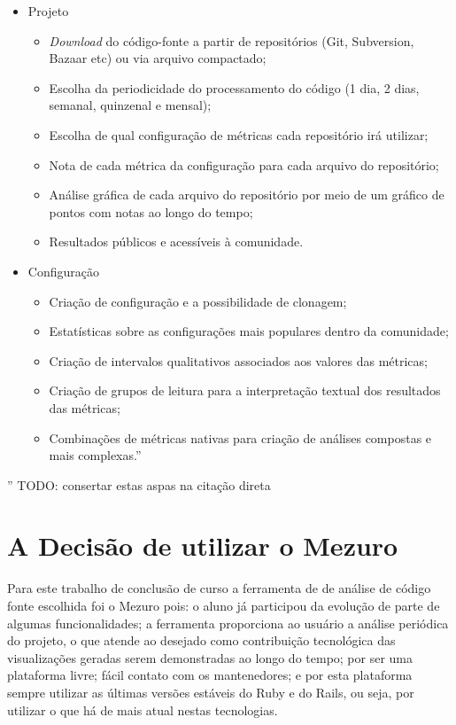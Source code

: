 \begin{itemize}
  \item Projeto
    \begin{itemize}
    \item \textit{Download} do código-fonte a partir de repositórios (Git,
    Subversion, Bazaar etc) ou via arquivo compactado;
        \item Escolha da periodicidade do processamento do código (1 dia, 2 dias,
        semanal, quinzenal e mensal);
        \item Escolha de qual configuração de métricas cada repositório irá
        utilizar;
        \item Nota de cada métrica da configuração para cada arquivo do
        repositório;
        \item Análise gráfica de cada arquivo do repositório por meio de um
        gráfico de pontos com notas ao longo do tempo;
        \item Resultados públicos e acessíveis à comunidade.
    \end{itemize}
    \item Configuração
    \begin{itemize}
    \item Criação de configuração e a possibilidade de clonagem;
        \item Estatísticas sobre as configurações mais populares dentro da
        comunidade;
        \item Criação de intervalos qualitativos associados aos valores das
        métricas;
        \item Criação de grupos de leitura para a interpretação textual dos
        resultados das métricas;
        \item Combinações de métricas nativas para criação de análises compostas
        e mais complexas.''
    \end{itemize}
\end{itemize}
''
TODO: consertar estas aspas na citação direta

\newpage

\section{A Decisão de utilizar o Mezuro}

Para este trabalho de conclusão de curso a ferramenta de de análise de código
fonte escolhida foi o Mezuro pois: o aluno já participou da evolução de parte
de algumas funcionalidades; a ferramenta proporciona ao usuário a análise
periódica do projeto, o que atende ao desejado como contribuição tecnológica
das visualizações geradas serem demonstradas ao longo do tempo; por ser uma
plataforma livre; fácil contato com os mantenedores; e por esta plataforma
sempre utilizar as últimas versões estáveis do Ruby e do Rails, ou seja,
por utilizar o que há de mais atual nestas tecnologias.


